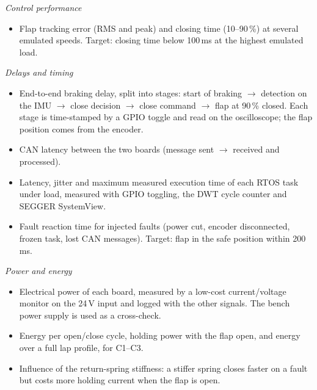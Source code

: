 \documentclass[11pt,a4paper]{article}
\begin{document}
\textit{Control performance}
\begin{itemize}
  \item Flap tracking error (RMS and peak) and closing time (10--90\,\%) at several emulated speeds. Target: closing time below 100\,ms at the highest emulated load.
\end{itemize}

\textit{Delays and timing}
\begin{itemize}
  \item End-to-end braking delay, split into stages: start of braking $\rightarrow$ detection on the IMU $\rightarrow$ close decision $\rightarrow$ close command $\rightarrow$ flap at 90\,\% closed. Each stage is time-stamped by a GPIO toggle and read on the oscilloscope; the flap position comes from the encoder.
  \item CAN latency between the two boards (message sent $\rightarrow$ received and processed).
  \item Latency, jitter and maximum measured execution time of each RTOS task under load, measured with GPIO toggling, the DWT cycle counter and SEGGER SystemView.
  \item Fault reaction time for injected faults (power cut, encoder disconnected, frozen task, lost CAN messages). Target: flap in the safe position within 200\,ms.
\end{itemize}

\textit{Power and energy}
\begin{itemize}
  \item Electrical power of each board, measured by a low-cost current/voltage monitor on the 24\,V input and logged with the other signals. The bench power supply is used as a cross-check.
  \item Energy per open/close cycle, holding power with the flap open, and energy over a full lap profile, for C1--C3.
  \item Influence of the return-spring stiffness: a stiffer spring closes faster on a fault but costs more holding current when the flap is open.
\end{itemize}
\end{document}
